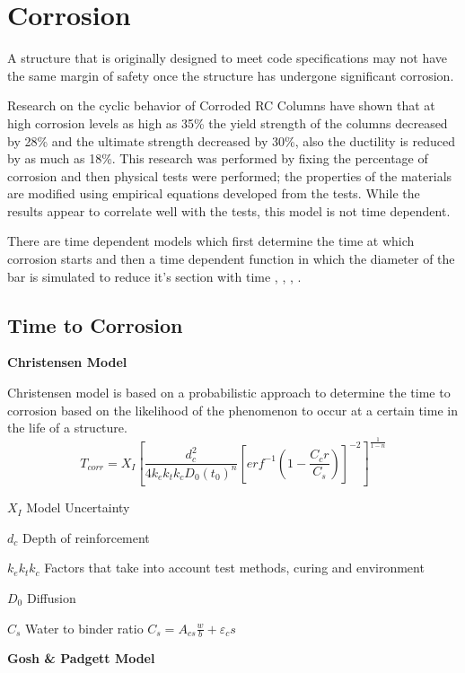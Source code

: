 \section{Corrosion}

A structure that is originally designed to meet code specifications may not have the same margin of safety once the structure has undergone significant corrosion. 

Research on the cyclic behavior of Corroded RC Columns \cite{Yuan2017a} have shown that at high corrosion levels as high as 35\% the yield strength of the columns decreased by 28\% and the ultimate strength decreased by 30\%, also the ductility is reduced by as much as 18\%. This research was performed by fixing the percentage of corrosion and then physical tests were performed; the properties of the materials are modified using empirical equations developed from the tests. While the results appear to correlate well with the tests, this model is not time dependent.

There are time dependent models which first determine the time at which corrosion starts and then a time dependent function in which the diameter of the bar is simulated to reduce it’s section with time \cite{Y.Liu1998a}, \cite{Choe2008}, \cite{Thoft-Christensen}, \cite{Vu2000}.

\subsection{Time to Corrosion}

\textbf{Christensen Model}

Christensen model is based on a probabilistic approach to determine the time to corrosion based on the likelihood of the phenomenon to occur at a certain time in the life of a structure. 
\begin{equation}
  T_{corr}=X_I \left[\frac{d_c^2}{4k_e k_t k_c D_0 (t_0 )^n }\left[erf^{-1} \left(1-\frac{C_cr}{C_s} \right) \right]^{-2} \right]^{\frac{1}{1-n}}
  \label{eq:one}
\end{equation} 

$X_I$ Model Uncertainty

$d_c$ Depth of reinforcement

$k_e k_t k_c$ Factors that take into account test methods, curing and environment

$D_0$ Diffusion

$C_s$ Water to binder ratio $C_s=A_{cs}\frac{w}{b}+\varepsilon_cs$


\textbf{Gosh \& Padgett Model}

